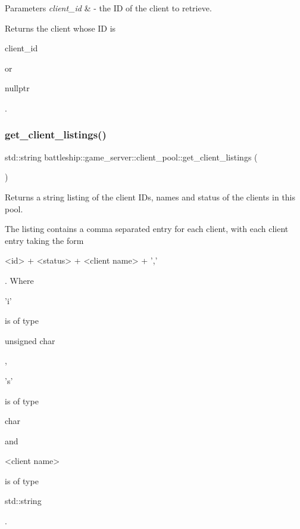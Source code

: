\begin{DoxyParams}{Parameters}
{\em client\+\_\+id} & -\/ the ID of the client to retrieve. \\
\hline
\end{DoxyParams}
\begin{DoxyReturn}{Returns}
the client whose ID is
\begin{DoxyCode}
client\_id 
\end{DoxyCode}
 or
\begin{DoxyCode}
\textcolor{keyword}{nullptr} 
\end{DoxyCode}
 . 
\end{DoxyReturn}
\mbox{\label{classbattleship_1_1game__server_1_1client__pool_a32441e47a79b098bb67261b18656bc7e}} 
\subsubsection{\texorpdfstring{get\+\_\+client\+\_\+listings()}{get\_client\_listings()}}
{\footnotesize\ttfamily std\+::string battleship\+::game\+\_\+server\+::client\+\_\+pool\+::get\+\_\+client\+\_\+listings (\begin{DoxyParamCaption}{ }\end{DoxyParamCaption})}

Returns a string listing of the client I\+Ds, names and status of the clients in this pool.

The listing contains a comma separated entry for each client, with each client entry taking the form
\begin{DoxyCode}
<\textcolor{keywordtype}{id}> + <status> + <client name> + \textcolor{charliteral}{','} 
\end{DoxyCode}
 . Where
\begin{DoxyCode}
\textcolor{charliteral}{'i'} 
\end{DoxyCode}
 is of type
\begin{DoxyCode}
\textcolor{keywordtype}{unsigned} \textcolor{keywordtype}{char} 
\end{DoxyCode}
 ,
\begin{DoxyCode}
\textcolor{charliteral}{'s'} 
\end{DoxyCode}
 is of type 
\begin{DoxyCode}
\textcolor{keywordtype}{char} 
\end{DoxyCode}
 and
\begin{DoxyCode}
<client name> 
\end{DoxyCode}
 is of type
\begin{DoxyCode}
std::string 
\end{DoxyCode}
 .

